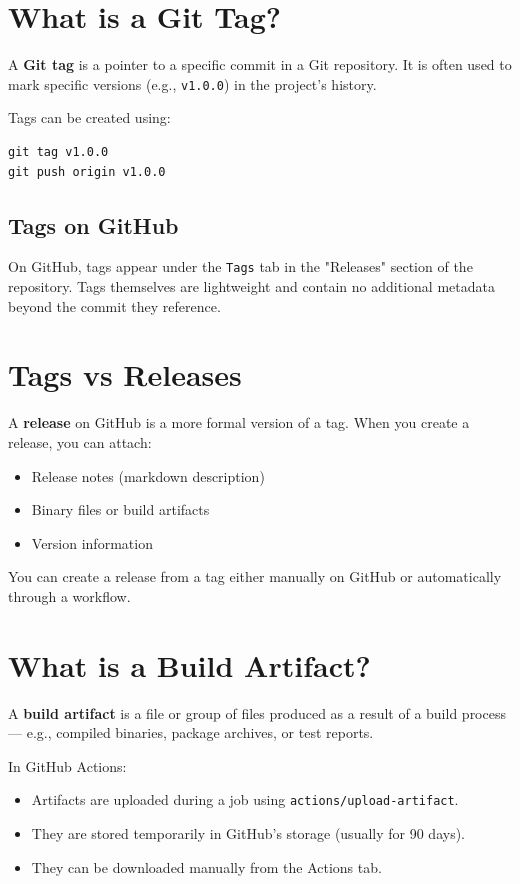 \documentclass{article}
\begin{document}
\section{What is a Git Tag?}
A \textbf{Git tag} is a pointer to a specific commit in a Git repository. It is often used to mark specific versions (e.g., \texttt{v1.0.0}) in the project's history.

Tags can be created using:
\begin{lstlisting}
git tag v1.0.0
git push origin v1.0.0
\end{lstlisting}

\subsection*{Tags on GitHub}
On GitHub, tags appear under the \texttt{Tags} tab in the "Releases" section of the repository. Tags themselves are lightweight and contain no additional metadata beyond the commit they reference.

\section{Tags vs Releases}
A \textbf{release} on GitHub is a more formal version of a tag. When you create a release, you can attach:
\begin{itemize}
    \item Release notes (markdown description)
    \item Binary files or build artifacts
    \item Version information
\end{itemize}

You can create a release from a tag either manually on GitHub or automatically through a workflow.

\section{What is a Build Artifact?}
A \textbf{build artifact} is a file or group of files produced as a result of a build process — e.g., compiled binaries, package archives, or test reports.

In GitHub Actions:
\begin{itemize}
    \item Artifacts are uploaded during a job using \texttt{actions/upload-artifact}.
    \item They are stored temporarily in GitHub's storage (usually for 90 days).
    \item They can be downloaded manually from the Actions tab.
\end{itemize}
\end{document}
